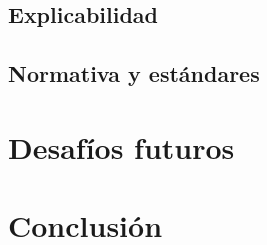 \subsection{Explicabilidad}

\subsection{Normativa y estándares}




\section{Desafíos futuros}


\section{Conclusión}









